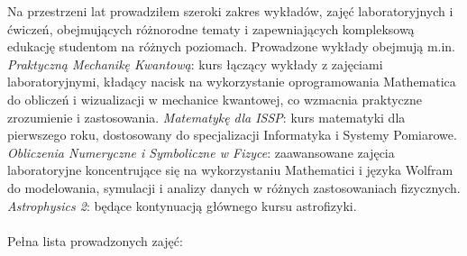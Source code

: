 \documentclass[12pt,a4paper]{article}
\begin{document}
Na przestrzeni lat prowadziłem szeroki zakres wykładów, zajęć laboratoryjnych i ćwiczeń, obejmujących różnorodne tematy i zapewniających kompleksową edukację studentom na różnych poziomach. Prowadzone wykłady obejmują m.in. \textit{Praktyczną Mechanikę Kwantową}: kurs łączący wykłady z zajęciami laboratoryjnymi, kładący nacisk na wykorzystanie oprogramowania Mathematica do obliczeń i wizualizacji w mechanice kwantowej, co wzmacnia praktyczne zrozumienie i zastosowania. \textit{Matematykę dla ISSP}: kurs matematyki dla pierwszego roku, dostosowany do specjalizacji Informatyka i Systemy Pomiarowe. \textit{Obliczenia Numeryczne i Symboliczne w Fizyce}: zaawansowane zajęcia laboratoryjne koncentrujące się na wykorzystaniu Mathematici i języka Wolfram do modelowania, symulacji i analizy danych w różnych zastosowaniach fizycznych. \textit{Astrophysics 2}: będące kontynuacją głównego kursu astrofizyki.\\
%
\\
Pełna lista prowadzonych zajęć:
\end{document}
